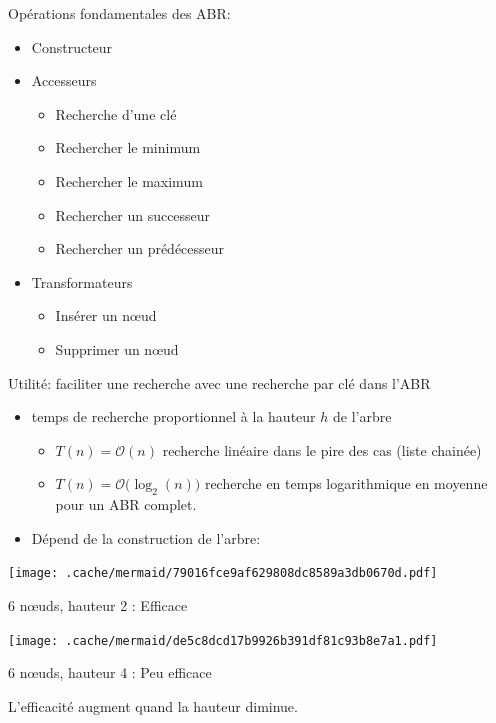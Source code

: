 Opérations fondamentales des ABR:

\begin{itemize}
\tightlist
\item
  Constructeur
\item
  Accesseurs

  \begin{itemize}
  \tightlist
  \item
    Recherche d'une clé
  \item
    Rechercher le minimum
  \item
    Rechercher le maximum
  \item
    Rechercher un successeur
  \item
    Rechercher un prédécesseur
  \end{itemize}
\item
  Transformateurs

  \begin{itemize}
  \tightlist
  \item
    Insérer un nœud
  \item
    Supprimer un nœud
  \end{itemize}
\end{itemize}

Utilité: faciliter une recherche avec une recherche par clé dans l'ABR

\begin{itemize}
\tightlist
\item
  temps de recherche proportionnel à la hauteur \(h\) de l'arbre

  \begin{itemize}
  \tightlist
  \item
    \(T(n) = \mathcal{O}(n)\) recherche linéaire dans le pire des cas
    (liste chainée)
  \item
    \(T(n) = \mathcal{O}\big(\log_2(n)\big)\) recherche en temps
    logarithmique en moyenne pour un ABR complet.
  \end{itemize}
\item
  Dépend de la construction de l'arbre:
\end{itemize}

\texttt{[image: .cache/mermaid/79016fce9af629808dc8589a3db0670d.pdf]}

6 nœuds, hauteur 2 : Efficace

\texttt{[image: .cache/mermaid/de5c8dcd17b9926b391df81c93b8e7a1.pdf]}

6 nœuds, hauteur 4 : Peu efficace

L'efficacité augment quand la hauteur diminue.


